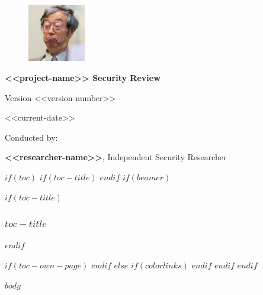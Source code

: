 \documentclass[
paper=a4,
captions=tableheading
]{$if(beamer)$$documentclass$$else$$if(book)$scrbook$else$scrartcl$endif$$endif$}
\begin{document}

\begin{titlepage}
  \vspace{4.5cm}
  \centering
  \begin{figure}[h]
    \centering
    \includegraphics[width=0.225\textwidth]{./logo/logo.pdf} 
  \end{figure}
  \vspace{0.5cm}
  {\Huge\bfseries <<project-name>> Security Review\par}
  \vspace{1cm}
  {\Large Version <<version-number>>\par}
  \vfill
  \raggedright
  {\large <<current-date>>\par}
  \vspace{0.35cm}
  {\large Conducted by:\par}
  \vspace{-0.075cm}
  {\large\textbf{<<researcher-name>>}, Independent Security Researcher\par}
\end{titlepage}


$if(toc)$
$if(toc-title)$
\renewcommand*\contentsname{$toc-title$}
$endif$
$if(beamer)$
\begin{frame}[allowframebreaks]
$if(toc-title)$
  \frametitle{$toc-title$}
$endif$
  \tableofcontents[hideallsubsections]
\end{frame}
$if(toc-own-page)$
\newpage
$endif$
$else$
{
$if(colorlinks)$
\hypersetup{linkcolor=$if(toccolor)$$toccolor$$else$$endif$}
$endif$
\setcounter{tocdepth}{$toc-depth$}
\tableofcontents
}
$endif$
$endif$


$body$

\end{document}
